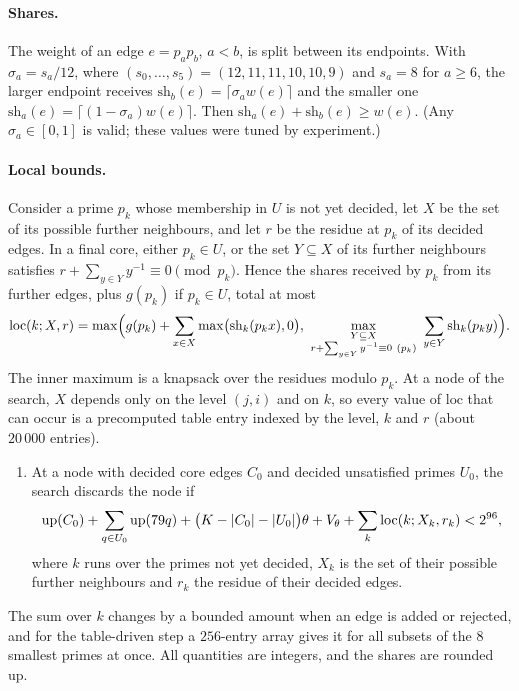 \documentclass[11pt]{article}
\begin{document}
\paragraph{Shares.}
The weight of an edge $e=p_ap_b$, $a<b$, is split between its endpoints. With $\sigma_a=s_a/12$, where $(s_0,\dots,s_5)=(12,11,11,10,10,9)$ and $s_a=8$ for $a\ge6$, the larger endpoint receives $\mathrm{sh}_b(e)=\lceil\sigma_a w(e)\rceil$ and the smaller one $\mathrm{sh}_a(e)=\lceil(1-\sigma_a)w(e)\rceil$. Then $\mathrm{sh}_a(e)+\mathrm{sh}_b(e)\ge w(e)$. (Any $\sigma_a\in[0,1]$ is valid; these values were tuned by experiment.)

\paragraph{Local bounds.}
Consider a prime $p_k$ whose membership in $U$ is not yet decided, let $X$ be the set of its possible further neighbours, and let $r$ be the residue at $p_k$ of its decided edges. In a final core, either $p_k\in U$, or the set $Y\subseteq X$ of its further neighbours satisfies $r+\sum_{y\in Y}y^{-1}\equiv0\pmod{p_k}$. Hence the shares received by $p_k$ from its further edges, plus $g(p_k)$ if $p_k\in U$, total at most
\[
\mathrm{loc}(k;X,r)=\max\Bigl(g(p_k)+\sum_{x\in X}\max\bigl(\mathrm{sh}_k(p_kx),0\bigr),\ \max_{\substack{Y\subseteq X\\ r+\sum_{y\in Y}y^{-1}\equiv0\ (p_k)}}\ \sum_{y\in Y}\mathrm{sh}_k(p_ky)\Bigr).
\]
The inner maximum is a knapsack over the residues modulo $p_k$. At a node of the search, $X$ depends only on the level $(j,i)$ and on $k$, so every value of $\mathrm{loc}$ that can occur is a precomputed table entry indexed by the level, $k$ and $r$ (about $20\,000$ entries).

\begin{enumerate}[label=\textup{(P\arabic*)},start=4]
\item\label{P4} At a node with decided core edges $C_0$ and decided unsatisfied primes $U_0$, the search discards the node if
\[
\operatorname{up}(C_0)+\sum_{q\in U_0}\operatorname{up}(79q)+\bigl(K-\lvert C_0\rvert-\lvert U_0\rvert\bigr)\theta+V_\theta+\sum_{k}\mathrm{loc}(k;X_k,r_k)<2^{96},
\]
where $k$ runs over the primes not yet decided, $X_k$ is the set of their possible further neighbours and $r_k$ the residue of their decided edges.
\end{enumerate}

The sum over $k$ changes by a bounded amount when an edge is added or rejected, and for the table-driven step a $256$-entry array gives it for all subsets of the $8$ smallest primes at once.
All quantities are integers, and the shares are rounded up.
\end{document}
